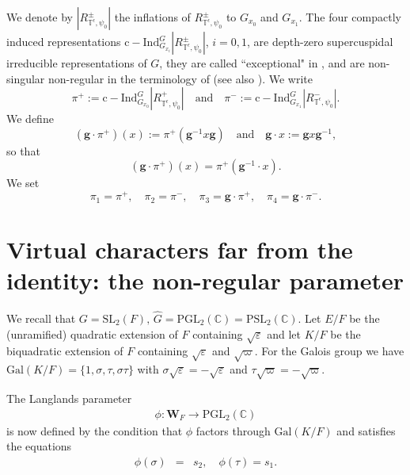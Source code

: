 \documentclass[11pt]{amsart}
\numberwithin{equation}{section}
\def\cInd{\mathrm{c\!\!-\!\!Ind}}
\def\g{\mathbf{g}}
\def\Gal{\mathrm{Gal}}
\def\PGL{\mathrm{PGL}}
\def\bW{\mathbf{W}}
\def\C{\mathbb{C}}
\def\SL{\mathrm{SL}}
\def\PSL{\mathrm{PSL}}
\def\n{\mathbf{n}}
\def\bbT{\mathbb{T}}
\def\g{\mathbf{g}}
\newcommand{\<}{\left\langle}
\renewcommand{\>}{\right\rangle}
\begin{document}
We denote by $|R_{\bbT^\epsilon,\psi_0}^\pm|$  the inflations of $R_{\bbT^\epsilon,\psi_0}^\pm$ to $G_{x_0}$ and $G_{x_1}$.
The four compactly induced representations $\cInd_{G_{x_i}}^G |R_{\bbT^\epsilon,\psi_0}^\pm|$, $i=0,1$, are depth-zero supercuspidal  irreducible representations of $G$, they are called ``exceptional" in \cite{ADSS}, and are non-singular non-regular  in the terminology of  \cite{Ka3} (see also \cite{Au2}). We write
\begin{equation} \label{eqn:nonsingular}
\pi^+:=\cInd_{G_{x_0}}^G |R_{\bbT^\epsilon,\psi_0}^+|\quad\text{and}\quad
\pi^-:=\cInd_{G_{x_1}}^G |R_{\bbT^\epsilon,\psi_0}^-|.
\end{equation}
We define
 \begin{equation*}
 (\g \cdot \pi^+)(x):= \pi^+(\g^{-1}x\g)\quad\text{and}\quad
 \g \cdot x:= \g x\g^{-1},
 \end{equation*}
 so that 
 \[
 (\g \cdot \pi^+)(x) = \pi^+(\g^{-1} \cdot x).
 \]
 We set 
 \begin{equation} \label{eqn:packet}
\pi_1 = \pi^+, \quad \pi_2 = \pi^-,\quad \pi_3 = \g \cdot \pi^+, \quad \pi_4 = \g\cdot \pi^- .
\end{equation}

\section{Virtual characters far from the identity: the non-regular parameter}  We recall that  $G = \SL_2(F), \, \widehat{G} = \PGL_2(\C) = \PSL_2(\C)$.   
Let $E/F$ be the (unramified) quadratic extension of $F$ containing $\sqrt \varepsilon$ and let $K/F$ be the biquadratic extension of $F$ containing $\sqrt \varepsilon$ and $\sqrt \varpi$.    
For the Galois group  we have $\Gal(K/F) = \{1,\sigma, \tau, \sigma \tau\}$ with $\sigma \sqrt \varepsilon = - \sqrt \varepsilon$ and $\tau \sqrt \varpi = - \sqrt \varpi$.   

  The Langlands parameter 
 \begin{eqnarray}\label{biquad}
 \phi \colon \bW_F \to \PGL_2(\C) 
 \end{eqnarray}
  is now defined   by the condition that $\phi$ factors through $\Gal(K/F)$ and satisfies the equations 
 \begin{eqnarray}\label{pd1}
  \phi(\sigma) &=& s_2, \quad   \phi(\tau) = s_1.
  \end{eqnarray}  
  
\end{document}
